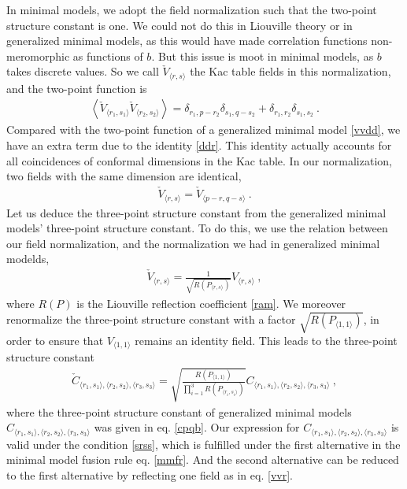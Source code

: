 \documentclass[12pt, a4paper, notitlepage, twoside]{report}
\numberwithin{equation}{section}
\theoremstyle{break}
\begin{document}
In minimal models, we adopt the field normalization such that the two-point structure constant is one. We could not do this in Liouville theory or in generalized minimal models, as this would have made correlation functions non-meromorphic as functions of $b$. But this issue is moot in minimal models, as $b$ takes discrete values. So we call $\check{V}_{\langle r,s\rangle}$ the Kac table fields in this normalization, and the two-point function is 
\begin{align}
 \boxed{\left\langle \check{V}_{\langle r_1,s_1 \rangle} \check{V}_{\langle r_2,s_2 \rangle} \right\rangle = \delta_{r_1,p-r_2}\delta_{s_1,q-s_2} + \delta_{r_1,r_2} \delta_{s_1,s_2}} \ .
\end{align}
Compared with the two-point function of a generalized minimal model \eqref{vvdd}, we have an extra term due to the identity \eqref{ddr}. This identity actually accounts for all coincidences of conformal dimensions in the Kac table. In our normalization, two fields with the same dimension are identical, 
\begin{align}
 \check{V}_{\langle r,s \rangle} = \check{V}_{\langle p-r,q-s \rangle}\ .
  \label{vvr}
\end{align}
Let us deduce the three-point structure constant from the generalized minimal models' three-point structure constant. To do this, we use the relation between our field normalization, and the normalization we had in generalized minimal modelds,
\begin{align}
 \check{V}_{\langle r,s \rangle} = \frac{1}{\sqrt{R(P_{\langle r,s \rangle})}} V_{\langle r,s \rangle}\ , 
\end{align}
where $R(P)$ is the Liouville reflection coefficient \eqref{ram}. We moreover renormalize the three-point structure constant with a factor $\sqrt{R(P_{\langle 1,1 \rangle})}$, in order to ensure that $V_{\langle 1,1\rangle}$ remains an identity field. This leads to the three-point structure constant 
\begin{align}
 \check{C}_{\langle r_1,s_1\rangle ,\langle r_2,s_2\rangle ,\langle r_3,s_3 \rangle} = \sqrt{\frac{R(P_{\langle 1,1 \rangle})}{\prod_{i=1}^3 R(P_{\langle r_i,s_i \rangle})}}  C_{\langle r_1,s_1\rangle ,\langle r_2,s_2\rangle ,\langle r_3,s_3 \rangle}\ ,
\label{tcc}
\end{align}
where the three-point structure constant of generalized minimal models $C_{\langle r_1,s_1\rangle ,\langle r_2,s_2\rangle ,\langle r_3,s_3 \rangle}$ was given in eq. \eqref{cpqb}. Our expression for $C_{\langle r_1,s_1\rangle ,\langle r_2,s_2\rangle ,\langle r_3,s_3 \rangle}$ is valid under the condition \eqref{srss}, which is fulfilled under the first alternative in the minimal model fusion rule eq. \eqref{mmfr}. And the second alternative can be reduced to the first alternative by reflecting one field as in eq. \eqref{vvr}.
\end{document}
